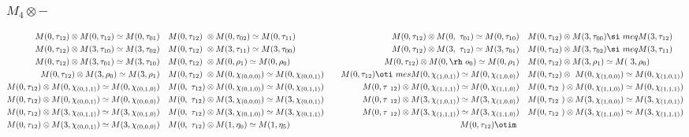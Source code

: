 \subsubsection{$M_4\otimes -$}
\begin{align*}
M(0,\tau_{12}) \otimes M(0,\tau_{12}) \simeq M(0,\tau_{01}) &&& M(0,\tau_{12})\
 \otimes M(0,\tau_{02}) \simeq M(0,\tau_{11}) &&& M(0,\tau_{12}) \otimes M(0,\
\tau_{01}) \simeq M(0,\tau_{10}) &&& M(0,\tau_{12}) \otimes M(3,\tau_{00}) \si\
meq M(3,\tau_{12})\\
M(0,\tau_{12}) \otimes M(3,\tau_{10}) \simeq M(3,\tau_{02}) &&& M(0,\tau_{12})\
 \otimes M(3,\tau_{11}) \simeq M(3,\tau_{00}) &&& M(0,\tau_{12}) \otimes M(3,\
\tau_{12}) \simeq M(3,\tau_{01}) &&& M(0,\tau_{12}) \otimes M(3,\tau_{02}) \si\
meq M(3,\tau_{11})\\
M(0,\tau_{12}) \otimes M(3,\tau_{01}) \simeq M(3,\tau_{10}) &&& M(0,\tau_{12})\
 \otimes M(0,\rho_{1}) \simeq M(0,\rho_{0}) &&& M(0,\tau_{12}) \otimes M(0,\rh\
o_{0}) \simeq M(0,\rho_{1}) &&& M(0,\tau_{12}) \otimes M(3,\rho_{1}) \simeq M(\
3,\rho_{0})\\
M(0,\tau_{12}) \otimes M(3,\rho_{0}) \simeq M(3,\rho_{1}) &&& M(0,\tau_{12}) \
\otimes M(0,\chi_{(0,0,0)}) \simeq M(0,\chi_{(0,0,1)}) &&& M(0,\tau_{12}) \oti\
mes M(0,\chi_{(1,0,1)}) \simeq M(0,\chi_{(1,0,0)}) &&& M(0,\tau_{12}) \otimes \
M(0,\chi_{(1,0,0)}) \simeq M(0,\chi_{(1,0,1)})\\
M(0,\tau_{12}) \otimes M(0,\chi_{(0,1,1)}) \simeq M(0,\chi_{(0,1,0)}) &&& M(0,\
\tau_{12}) \otimes M(0,\chi_{(0,1,0)}) \simeq M(0,\chi_{(0,1,1)}) &&& M(0,\tau\
_{12}) \otimes M(0,\chi_{(1,1,1)}) \simeq M(0,\chi_{(1,1,0)}) &&& M(0,\tau_{12\
}) \otimes M(0,\chi_{(1,1,0)}) \simeq M(0,\chi_{(1,1,1)})\\
M(0,\tau_{12}) \otimes M(0,\chi_{(0,0,1)}) \simeq M(0,\chi_{(0,0,0)}) &&& M(0,\
\tau_{12}) \otimes M(3,\chi_{(0,0,0)}) \simeq M(3,\chi_{(0,0,1)}) &&& M(0,\tau\
_{12}) \otimes M(3,\chi_{(1,0,1)}) \simeq M(3,\chi_{(1,0,0)}) &&& M(0,\tau_{12\
}) \otimes M(3,\chi_{(1,0,0)}) \simeq M(3,\chi_{(1,0,1)})\\
M(0,\tau_{12}) \otimes M(3,\chi_{(0,1,1)}) \simeq M(3,\chi_{(0,1,0)}) &&& M(0,\
\tau_{12}) \otimes M(3,\chi_{(0,1,0)}) \simeq M(3,\chi_{(0,1,1)}) &&& M(0,\tau\
_{12}) \otimes M(3,\chi_{(1,1,1)}) \simeq M(3,\chi_{(1,1,0)}) &&& M(0,\tau_{12\
}) \otimes M(3,\chi_{(1,1,0)}) \simeq M(3,\chi_{(1,1,1)})\\
M(0,\tau_{12}) \otimes M(3,\chi_{(0,0,1)}) \simeq M(3,\chi_{(0,0,0)}) &&& M(0,\
\tau_{12}) \otimes M(1,\eta_{0}) \simeq M(1,\eta_{5}) &&& M(0,\tau_{12}) \otim\

\end{align*}
